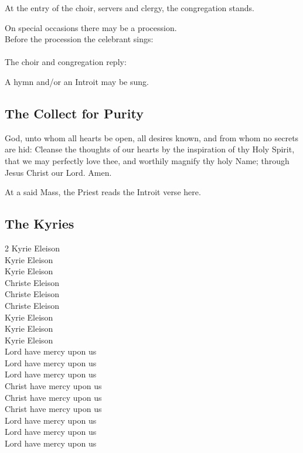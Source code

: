 
\begin{rubric}
At the entry of the choir, servers and clergy, the congregation stands.
\end{rubric}

\begin{rubric}
On special occasions there may be a procession.\\
Before the procession the celebrant sings:\\
\\
The choir and congregation reply:\\
\end{rubric}

\begin{rubric}
A hymn and/or an Introit may be sung.
\end{rubric}

\subsection{The Collect for Purity}

 God, unto whom all hearts be open, all desires known, and from whom no secrets are hid:
Cleanse the thoughts of our hearts by the inspiration of thy Holy Spirit, that we may perfectly love thee,
and worthily magnify thy holy Name; through Jesus Christ our Lord. Amen.

\begin{rubric}
At a said Mass, the Priest reads the Introit verse here.
\end{rubric}

\subsection{The Kyries}

\begin{multicols}{2}
Kyrie Eleison\\
Kyrie Eleison\\
Kyrie Eleison\\
Christe Eleison\\
Christe Eleison\\
Christe Eleison\\
Kyrie Eleison\\
Kyrie Eleison\\
Kyrie Eleison\\
Lord have mercy upon us\\
Lord have mercy upon us\\
Lord have mercy upon us\\
Christ have mercy upon us\\
Christ have mercy upon us\\
Christ have mercy upon us\\
Lord have mercy upon us\\
Lord have mercy upon us\\
Lord have mercy upon us
\end{multicols}

